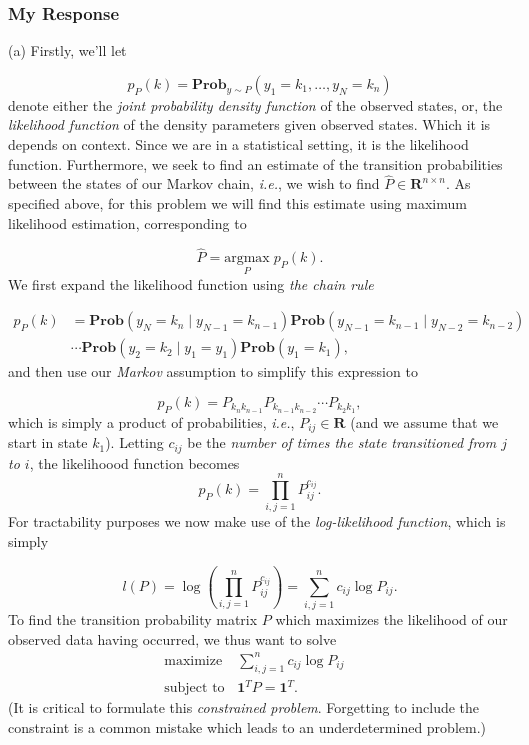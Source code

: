 \documentclass[12pt,reqno]{article}
\theoremstyle{definition}
\numberwithin{equation}{section}
\begin{document}
\subsubsection*{My Response}
\noindent (a) Firstly, we'll let

\[p_{P}(k) = \mathbf{Prob}_{y \sim P}\left(y_1 = k_1, \ldots, y_N = k_n\right)\]
denote either the \textit{joint probability density function} of the observed states, or,
the \textit{likelihood function} of the density parameters given observed states. Which it is depends on context.
Since we are in a statistical setting, it is the likelihood function. Furthermore, we seek to find an estimate
of the transition probabilities between the states of our Markov chain, \textit{i.e.}, we wish to find $\hat{P} \in \mathbf{R}^{n \times n}$.
As specified above, for this problem we will find this estimate using maximum likelihood estimation, corresponding to 

\[\hat{P} = \underset{P}{\mathrm{argmax}} \; p_P(k). \]
We first expand the likelihood function using \textit{the chain rule}

\[ \begin{aligned}
    p_{P}(k) &= \mathbf{Prob}\left(y_{N} = k_n \mid y_{N-1} = k_{n-1}\right) \mathbf{Prob}\left(y_{N-1}=k_{n-1} \mid y_{N-2} = k_{n-2} \right)\\
&\cdots \mathbf{Prob}(y_{2} = k_{2} \mid y_{1} = y_{1}) \mathbf{Prob}\left(y_1 = k_1\right),
\end{aligned} \]
and then use our \textit{Markov} assumption to simplify this expression to

\[p_{P}(k) = P_{k_{n}k_{n-1}}P_{k_{n-1}k_{n-2}} \cdots P_{k_{2}k_{1}},\]
which is simply a product of probabilities, \textit{i.e.}, $P_{ij} \in \mathbf{R}$ (and we assume
that we start in state $k_1$). Letting $c_{ij}$ be the \textit{number of times the state transitioned
from $j$ to $i$}, the likelihoood function becomes
\[p_{P}(k) = \prod_{i, j=1}^{n}P_{ij}^{c_{ij}}.\]
For tractability purposes we now make use of the \textit{log-likelihood function}, which is simply

\[l(P) = \log \left( \prod_{i, j=1}^{n}P_{ij}^{c_{ij}} \right) = \sum_{i, j=1}^{n} c_{ij}\log P_{ij}.\]
To find the transition probability matrix $P$ which maximizes the likelihood of our observed data having occurred,
we thus want to solve
\[\begin{array}{lll}
\text{maximize} \; & \sum_{i, j=1}^{n} c_{ij}\log P_{ij} & \\
\text{subject to} & \bm{1}^T P = \bm{1}^T.
\end{array}\]
(It is critical to formulate this \textit{constrained problem}. Forgetting to include the constraint
is a common mistake which leads to an underdetermined problem.)
\end{document}
